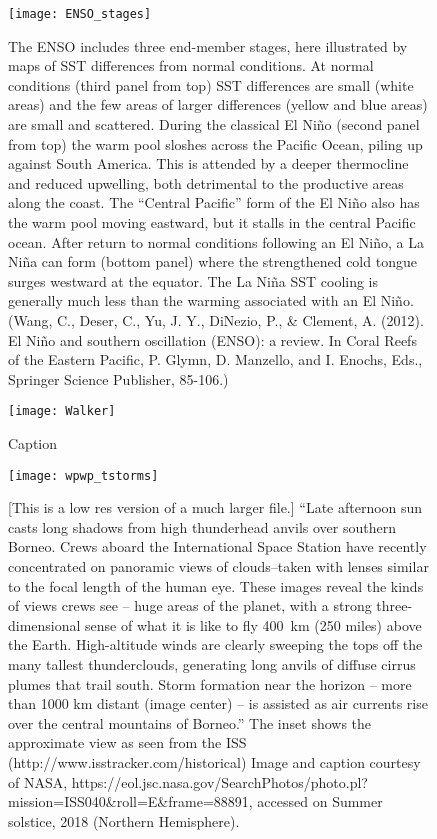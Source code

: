 \documentclass[amstex,12pt]{book}
\begin{document}
{\newpage
\begin{figure}[ht]
\centering
\texttt{[image: ENSO\_stages]}%
\caption{The ENSO includes three end-member stages, here illustrated by maps of SST differences from normal conditions. At normal conditions (third panel from top) SST differences are small (white areas) and the few areas of larger differences (yellow and blue areas) are small and scattered. During the classical El Ni\~no (second panel from top) the warm pool sloshes across the Pacific Ocean, piling up against South America. This is attended by a deeper thermocline and reduced upwelling, both detrimental to the productive areas along the coast. The ``Central Pacific'' form of the El Ni\~no also has the warm pool moving eastward, but it stalls in the central Pacific ocean. After return to normal conditions following an El Ni\~no, a La Ni\~na can form (bottom panel) where the strengthened cold tongue surges westward at the equator. The La Ni\~na SST cooling is generally much less than the warming associated with an El Ni\~no. (Wang, C., Deser, C., Yu, J. Y., DiNezio, P., \& Clement, A. (2012). El Ni\~no and southern oscillation (ENSO): a review. In Coral Reefs of the Eastern Pacific, P. Glymn, D. Manzello, and I. Enochs, Eds., Springer Science Publisher, 85-106.)}    
\label{fig:enso_stages}
\end{figure} 

\newpage
\begin{figure}[ht]
\centering
\texttt{[image: Walker]}%
\caption{Caption}    
\label{fig:walker}
\end{figure} %


\newpage
\begin{figure}[ht]
\centering
\texttt{[image: wpwp\_tstorms]}%
\caption{[This is a low res version of a much larger file.] ``Late afternoon sun casts long shadows from high thunderhead anvils over southern Borneo. Crews aboard the International Space Station have recently concentrated on panoramic views of clouds--taken with lenses similar to the focal length of the human eye. These images reveal the kinds of views crews see -- huge areas of the planet, with a strong three-dimensional sense of what it is like to fly \SI{400}{\kilo\metre} (250 miles) above the Earth. High-altitude winds are clearly sweeping the tops off the many tallest thunderclouds, generating long anvils of diffuse cirrus plumes that trail south. Storm formation near the horizon -- more than 1000 km distant (image center) -- is assisted as air currents rise over the central mountains of Borneo.'' The inset shows the approximate view as seen from the ISS (http://www.isstracker.com/historical) Image and caption courtesy of NASA, https://eol.jsc.nasa.gov/SearchPhotos/photo.pl?mission=ISS040\&roll=E\&frame=88891, accessed on Summer solstice, 2018 (Northern Hemisphere).}    
\label{fig:wpwp_tstorms}
\end{figure} 



}
\end{document}

